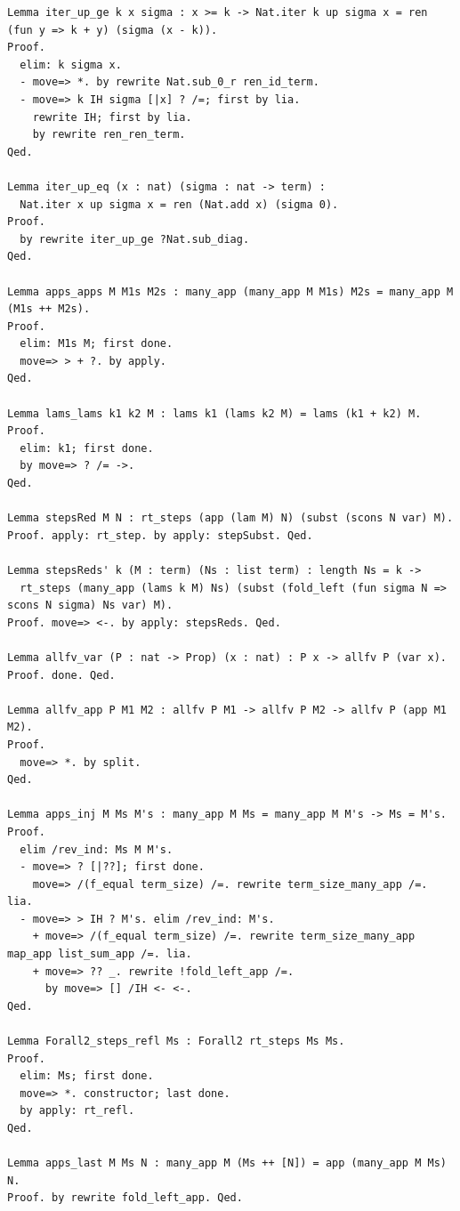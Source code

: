 \begin{lstlisting}
Lemma iter_up_ge k x sigma : x >= k -> Nat.iter k up sigma x = ren (fun y => k + y) (sigma (x - k)).
Proof.
  elim: k sigma x.
  - move=> *. by rewrite Nat.sub_0_r ren_id_term. 
  - move=> k IH sigma [|x] ? /=; first by lia.
    rewrite IH; first by lia.
    by rewrite ren_ren_term.
Qed.

Lemma iter_up_eq (x : nat) (sigma : nat -> term) :
  Nat.iter x up sigma x = ren (Nat.add x) (sigma 0).
Proof.
  by rewrite iter_up_ge ?Nat.sub_diag.
Qed.

Lemma apps_apps M M1s M2s : many_app (many_app M M1s) M2s = many_app M (M1s ++ M2s).
Proof.
  elim: M1s M; first done.
  move=> > + ?. by apply.
Qed.

Lemma lams_lams k1 k2 M : lams k1 (lams k2 M) = lams (k1 + k2) M.
Proof.
  elim: k1; first done.
  by move=> ? /= ->.
Qed.

Lemma stepsRed M N : rt_steps (app (lam M) N) (subst (scons N var) M).
Proof. apply: rt_step. by apply: stepSubst. Qed.

Lemma stepsReds' k (M : term) (Ns : list term) : length Ns = k ->
  rt_steps (many_app (lams k M) Ns) (subst (fold_left (fun sigma N => scons N sigma) Ns var) M).
Proof. move=> <-. by apply: stepsReds. Qed.

Lemma allfv_var (P : nat -> Prop) (x : nat) : P x -> allfv P (var x).
Proof. done. Qed.

Lemma allfv_app P M1 M2 : allfv P M1 -> allfv P M2 -> allfv P (app M1 M2).
Proof.
  move=> *. by split.
Qed.

Lemma apps_inj M Ms M's : many_app M Ms = many_app M M's -> Ms = M's.
Proof.
  elim /rev_ind: Ms M M's.
  - move=> ? [|??]; first done.
    move=> /(f_equal term_size) /=. rewrite term_size_many_app /=. lia.
  - move=> > IH ? M's. elim /rev_ind: M's.
    + move=> /(f_equal term_size) /=. rewrite term_size_many_app map_app list_sum_app /=. lia.
    + move=> ?? _. rewrite !fold_left_app /=.
      by move=> [] /IH <- <-.
Qed.

Lemma Forall2_steps_refl Ms : Forall2 rt_steps Ms Ms.
Proof.
  elim: Ms; first done.
  move=> *. constructor; last done.
  by apply: rt_refl.
Qed.

Lemma apps_last M Ms N : many_app M (Ms ++ [N]) = app (many_app M Ms) N.
Proof. by rewrite fold_left_app. Qed.


\end{lstlisting}
